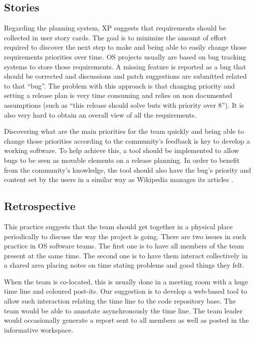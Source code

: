 \subsection{Stories}
\label{subsec:stories}

Regarding the planning system, XP suggests that requirements should be
collected in user story cards. The goal is to minimize the amount of
effort required to discover the next step to make and being able to
easily change those requirements priorities over time. OS projects
usually are based on bug tracking systems to store those
requirements. A missing feature is reported as a bug that should be
corrected and discussions and patch suggestions are submitted related
to that ``bug''. The problem with this approach is that changing
priority and setting a release plan is very time consuming and relies
on non documented assumptions (such as ``this release should solve
buts with priority over 8'').  It is also very hard to obtain an
overall view of all the requirements.

Discovering what are the main priorities for the team quickly and
being able to change those priorities according to the community's
feedback is key to develop a working software. To help achieve this, a
tool should be implemented to allow bugs to be seen as movable
elements on a release planning. In order to benefit from the
community's knowledge, the tool should also have the bug's priority
and content set by the users in a similar way as Wikipedia manages its
articles \cite{Surowiecki2004,Tapscott2006,Benkler2006}.

\subsection{Retrospective}
\label{subsec:retrospect}

This practice suggests that the team should get together in a physical
place periodically to discuss the way the project is going. There are
two issues in such practice in OS software teams. The first one is to
have all members of the team present at the same time. The second one
is to have them interact collectively in a shared area placing notes
on time stating problems and good things they felt.

When the team is co-located, this is usually done in a meeting room
with a huge time line and coloured post-its. Our suggestion is to
develop a web-based tool to allow such interaction relating the time
line to the code repository base. The team would be able to annotate
asynchronously the time line. The team leader would occasionally
generate a report sent to all members as well as posted in the
informative workspace.

